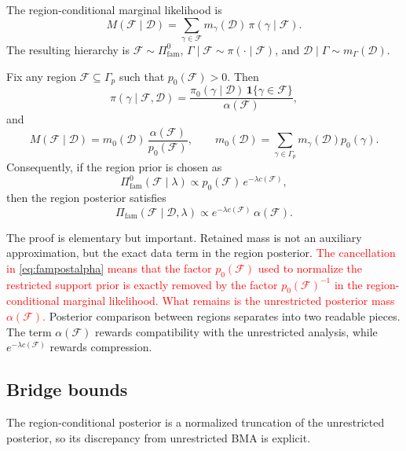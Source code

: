 \documentclass[twoside,11pt]{article}
\newcommand{\D}{\mathcal{D}}
\newcommand{\F}{\mathcal{F}}
\newcommand{\ind}{\mathbf{1}}
\newcommand{\rev}[1]{\textcolor{red}{#1}}
\begin{document}
The region-conditional marginal likelihood is
\[
M(\F \mid \D) = \sum_{\gamma \in \F} m_\gamma(\D)\, \pi(\gamma \mid \F).
\]
The resulting hierarchy is \(\F \sim \Pi_{\mathrm{fam}}^0\), \(\Gamma \mid \F \sim \pi(\cdot \mid \F)\), and \(\D \mid \Gamma \sim m_\Gamma(\D)\).

\begin{theorem}
\label{thm:alignment}
Fix any region \(\F \subseteq \Gamma_p\) such that \(p_0(\F)>0\). Then
\begin{equation}
\pi(\gamma \mid \F,\D) = \frac{\pi_0(\gamma \mid \D)\,\ind\{\gamma \in \F\}}{\alpha(\F)}, \label{eq:restrictedpost}
\end{equation}
and
\begin{equation}
M(\F \mid \D) = m_0(\D)\, \frac{\alpha(\F)}{p_0(\F)}, \qquad m_0(\D) = \sum_{\gamma \in \Gamma_p} m_\gamma(\D)p_0(\gamma). \label{eq:margalpha}
\end{equation}
Consequently, if the region prior is chosen as
\[
\Pi_{\mathrm{fam}}^0(\F \mid \lambda) \propto p_0(\F)\,e^{-\lambda c(\F)},
\]
then the region posterior satisfies
\begin{equation}
\Pi_{\mathrm{fam}}(\F \mid \D,\lambda) \propto e^{-\lambda c(\F)}\,\alpha(\F). \label{eq:fampostalpha}
\end{equation}
\end{theorem}

The proof is elementary but important. Retained mass is not an auxiliary approximation, but the exact data term in the region posterior. \rev{The cancellation in \eqref{eq:fampostalpha} means that the factor \(p_0(\F)\) used to normalize the restricted support prior is exactly removed by the factor \(p_0(\F)^{-1}\) in the region-conditional marginal likelihood. What remains is the unrestricted posterior mass \(\alpha(\F)\).} Posterior comparison between regions separates into two readable pieces. The term \(\alpha(\F)\) rewards compatibility with the unrestricted analysis, while \(e^{-\lambda c(\F)}\) rewards compression.

\subsection{Bridge bounds}

The region-conditional posterior is a normalized truncation of the unrestricted posterior, so its discrepancy from unrestricted BMA is explicit.
\end{document}
